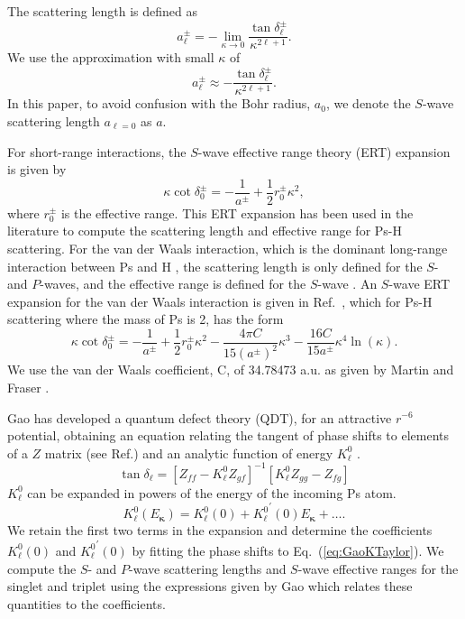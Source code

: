 \documentclass[preprint,showpacs,showkeys,preprintnumbers,amsmath,amssymb,longbibliography,pra,aps]{revtex4-1}
\begin{document}
The scattering length is defined as \cite{Bransden2003}
\begin{equation}
\label{eq:ScatLen}
a_\ell^\pm = -\lim_{\kappa \to 0}
  \frac{\tan{\delta_\ell^\pm}}{\kappa^{2\ell+1}}.
\end{equation}
We use the approximation with small $\kappa$ of
\begin{equation}
\label{eq:ScatLenApprox}
a_\ell^\pm \approx
  - \frac{\tan{\delta_\ell^\pm}}{\kappa^{2\ell+1}}.
\end{equation}
In this paper, to avoid confusion with the Bohr radius, $a_0$, we denote
the $S$-wave scattering length $a_{\ell=0}$ as $a$.

For short-range interactions, the $S$-wave effective range theory (ERT)
expansion is given by \cite{Bethe1949,Blatt1949}
\begin{equation}
\label{eq:EffectiveRangeShort}
\kappa \cot\delta_0^\pm = -\frac{1}{a^\pm} + \frac{1}{2} r_0^\pm \kappa^2,
\end{equation}
where $r_0^\pm$ is the effective range.
This ERT expansion has been used in the literature
\cite{Ivanov2002,VanReeth2003,Blackwood2002,Walters2004} to compute the
scattering length and effective range for Ps-H scattering. 
For the van der Waals interaction, which is the dominant long-range
interaction between Ps and H \cite{Fabrikant2014,VanReeth2003,Au1986},
the scattering length is only defined for the $S$- and $P$-waves, and the 
effective range is defined for the $S$-wave \cite{Levy1963}.
An $S$-wave ERT expansion for the van der Waals interaction is given in
Ref.~\cite{Drake2006}, which for Ps-H scattering where the mass of Ps
is 2, has the form
\begin{equation}
\label{eq:EffectiveRangeLongAu}
\kappa \cot\delta_0^\pm = -\frac{1}{a^\pm} + \frac{1}{2} r_0^\pm \kappa^2 - 
  \frac{4 \pi C}{15 (a^\pm)^2} \kappa^3 - 
  \frac{16 C}{15 a^\pm} \kappa^4 \ln \left(\kappa \right).
\end{equation}
We use the van der Waals coefficient, C, of 34.78473 a.u. as given
by Martin and Fraser \cite{Martin1980}.

Gao \cite{Gao1998} has developed a quantum defect theory (QDT),
for an attractive $r^{-6}$ potential, obtaining an equation relating
the tangent of phase shifts to elements of a $Z$ matrix
(see Ref.\cite{Gao1998}) and an analytic function of energy $K_\ell^0$
\cite{Gao1998a}.
\begin{equation}
\label{eq:GaoZEqn}
\tan\delta_\ell = [Z_{ff} - K_\ell^0 Z_{gf}]^{-1}
  [K_\ell^0 Z_{gg} - Z_{fg}]
\end{equation}
$K_\ell^0$ can be expanded in powers of the energy \cite{Gao1998a} of the incoming Ps atom.
\begin{equation}
\label{eq:GaoKTaylor}
K_\ell^0(E_{\bm \kappa}) = K_\ell^0(0) + {K_\ell^0}^\prime(0) E_{\bm \kappa}
  + \ldots.
\end{equation}
We retain the first two terms in the expansion and determine the coefficients
$K_\ell^0(0)$ and ${K_\ell^0}^\prime(0)$ by fitting the phase shifts to
Eq.~(\ref{eq:GaoKTaylor}). We compute the $S$- and $P$-wave scattering lengths
and $S$-wave effective ranges for the singlet and triplet using the expressions
given by Gao \cite{Gao1998a} which relates these quantities to the
coefficients.
\end{document}
